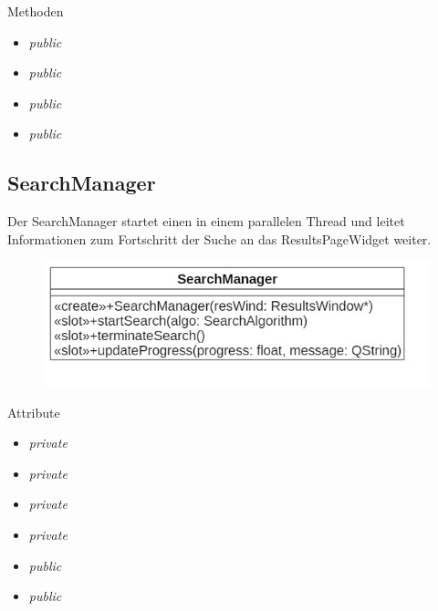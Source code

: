 Methoden
\begin{itemize}
	\item\textit{public }
	
	\item\textit{public }
	
	\item\textit{public }
	
	\item\textit{public }
	
\end{itemize}

\subsection*{SearchManager}
Der SearchManager startet einen  in einem parallelen Thread und leitet Informationen zum Fortschritt der Suche an das ResultsPageWidget weiter.

\begin{figure}[H]
\centering
\includegraphics[scale=0.5]{img/Klassendiagramm/Klassen/Controller/SearchManager}
\label{fig:searchManager}
\end{figure}

Attribute
\begin{itemize}
	\item\textit{private }
	
	\item\textit{private }
	
	\item\textit{private }
	
	\item\textit{private }
	
	\item\textit{public }  
	
	\item\textit{public }
	
\end{itemize}

